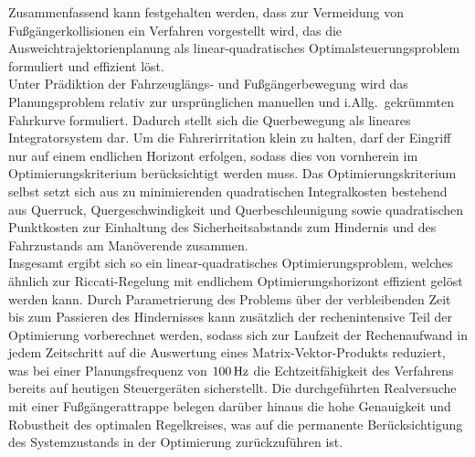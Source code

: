 Zusammenfassend kann festgehalten werden, dass zur Vermeidung von Fußgängerkollisionen ein Verfahren vorgestellt wird, das die Ausweichtrajektorienplanung als linear-quadratisches Optimalsteuerungsproblem formuliert und effizient löst. \\
Unter Prädiktion der Fahrzeuglängs- und Fußgängerbewegung wird das Planungsproblem relativ zur ursprünglichen manuellen und i.Allg.\ gekrümmten Fahrkurve formuliert. Dadurch stellt sich die Querbewegung als lineares Integratorsystem dar. Um die Fahrerirritation klein zu halten, darf der Eingriff nur auf einem endlichen Horizont erfolgen, sodass dies von vornherein im Optimierungskriterium berücksichtigt werden muss. Das Optimierungskriterium selbst setzt sich aus zu minimierenden quadratischen Integralkosten bestehend aus Querruck, Quergeschwindigkeit und Querbeschleunigung sowie quadratischen Punktkosten zur Einhaltung des Sicherheitsabstands zum Hindernis und des Fahrzustands am Manöverende zusammen. \\
Insgesamt ergibt sich so ein %
linear-quadratisches Optimierungsproblem, welches ähnlich zur Riccati-Regelung mit endlichem Optimierungshorizont effizient gelöst werden kann. Durch Parametrierung des Problems über der verbleibenden Zeit bis zum Passieren des Hindernisses kann zusätzlich der rechenintensive Teil der Optimierung vorberechnet werden, sodass sich zur Laufzeit der Rechenaufwand in jedem Zeitschritt auf die Auswertung eines Matrix-Vektor-Produkts reduziert, was bei einer Planungsfrequenz von $\unit[100]{Hz}$ die Echtzeitfähigkeit des Verfahrens bereits auf heutigen Steuergeräten sicherstellt. Die durchgeführten Realversuche mit einer Fußgängerattrappe belegen darüber hinaus die hohe Genauigkeit und Robustheit des optimalen Regelkreises, was auf die permanente Berücksichtigung des Systemzustands in der Optimierung zurückzuführen ist.


